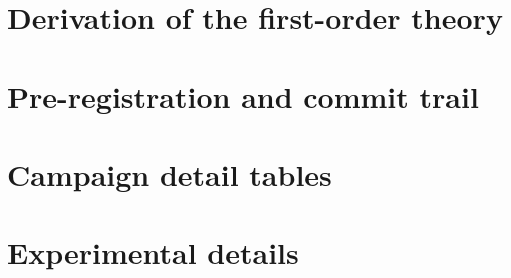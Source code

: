 \documentclass[a4paper,fleqn]{cas-sc}
\begin{document}



\appendix
\section{Derivation of the first-order theory}\label{app:theory}


\section{Pre-registration and commit trail}\label{app:prereg}


\section{Campaign detail tables}\label{app:campaign}


\section{Experimental details}\label{app:details}


\end{document}
